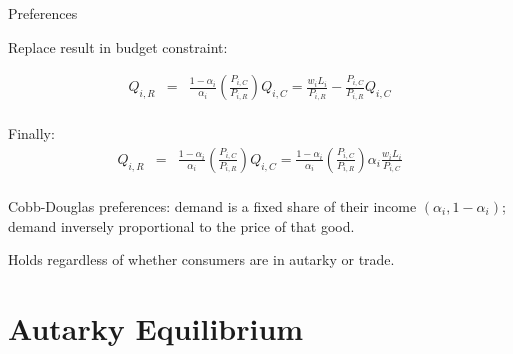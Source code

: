 \documentclass[notes,11pt, aspectratio=169, xcolor=table]{beamer}
\newenvironment{wideitemize}{\itemize\addtolength{\itemsep}{10pt}}{\enditemize}
\begin{document}
\begin{frame}{Preferences}
\begin{wideitemize}
        \item Replace result in budget constraint:

\scriptsize{
\begin{eqnarray*}
    Q_{i,R}&=& \frac{1-\alpha_i}{\alpha_i } \left( \frac{P_{i,C}}{P_{i,R}}\right) Q_{i,C}  = \frac{w_i L_i}{P_{i,R}} - \frac{P_{i,C}}{P_{i,R} } Q_{i,C} \\
\end{eqnarray*}
}

\normalsize
\begin{center}
\end{center}


\item<2-> Finally:
{\scriptsize
\begin{eqnarray*}
     Q_{i,R}  &=& \frac{1-\alpha_i}{\alpha_i } \left( \frac{P_{i,C}}{P_{i,R}}\right) Q_{i,C}  = \frac{1-\alpha_i}{\alpha_i } \left( \frac{P_{i,C}}{P_{i,R}}\right) \alpha_i  \frac{w_i L_i}{P_{i,C}} \\
\end{eqnarray*}
}

\begin{center}
\end{center}

\item<3-> Cobb-Douglas preferences: demand is a fixed share of their income $(\alpha_i, 1-\alpha_i)$; demand inversely proportional to the price of that good.
\item<4-> Holds regardless of whether consumers are in autarky or trade. 

\end{wideitemize}
\end{frame}

\section{Autarky Equilibrium}
\end{document}
